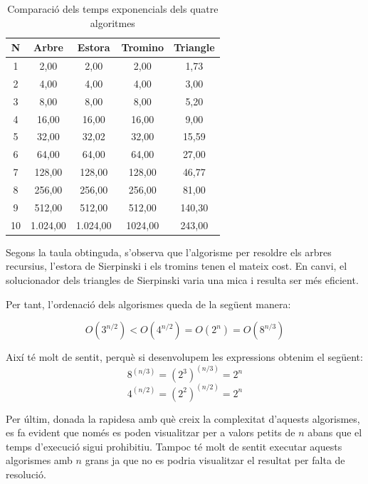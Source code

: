 \documentclass{ieeetj}
\begin{document}
\begin{table}[h]
    \centering
    \begin{tabular}{|c|c|c|c|c|}
        \hline
        \textbf{N} & \textbf{Arbre} & \textbf{Estora} & \textbf{Tromino} & \textbf{Triangle} \\
        \hline
        1  & 2,00    & 2,00      &  2,00  & 1,73  \\
        2  & 4,00    & 4,00      &  4,00  & 3,00  \\
        3  & 8,00    & 8,00     &  8,00  & 5,20  \\
        4  & 16,00   & 16,00     & 16,00  & 9,00  \\
        5  & 32,00   & 32,02    & 32,00 & 15,59 \\
        6  & 64,00   & 64,00    & 64,00 & 27,00 \\
        7  & 128,00  & 128,00  & 128,00 & 46,77 \\
        8  & 256,00  & 256,00  & 256,00 & 81,00 \\
        9  & 512,00  & 512,00 & 512,00 & 140,30 \\
        10 & 1.024,00 & 1.024,00 & 1024,00 & 243,00 \\
        \hline
    \end{tabular}
    \vspace{5mm}
    \caption{Comparació dels temps exponencials dels quatre algoritmes}
    \label{tab:complexitat}
\end{table}

Segons la taula obtinguda, s'observa que l'algorisme per resoldre els arbres recursius, l'estora de Sierpinski i els tromins tenen el mateix cost. En canvi, el solucionador dels triangles de Sierpinski varia una mica i resulta ser més eficient.

Per tant, l'ordenació dels algorismes queda de la següent manera:

\[
\boxed{O(3^{n/2}) < O(4^{n/2}) = O(2^n) = O(8^{n/3})}
\]



Així té molt de sentit, perquè si desenvolupem les expressions obtenim el següent:  
\[\boxed{
8^{(n/3)} = (2^3)^{(n/3)} = 2^n}
\]  
\[\boxed{
4^{(n/2)} = (2^2)^{(n/2)} = 2^n
}\]


Per últim, donada la rapidesa amb què creix la complexitat d'aquests algorismes, es fa evident que només es poden visualitzar per a valors petits de \( n \) abans que el temps d'execució sigui prohibitiu.
Tampoc té molt de sentit executar aquests algorismes amb \(n \) grans ja que no es podria visualitzar el resultat per falta de resolució.
\end{document}

